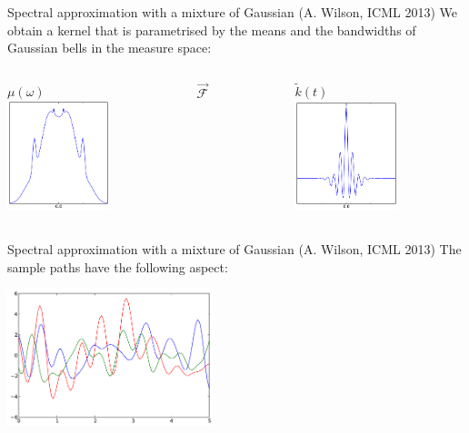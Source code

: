 \begin{frame}{Spectral approximation with a mixture of Gaussian (A. Wilson, ICML 2013)}
We obtain a kernel that is parametrised by the means and the bandwidths of Gaussian bells in the measure space:
\begin{columns}[c]
\begin{column}{5cm}
\begin{center}
$\mu(\omega)$ \\
\includegraphics[width=3cm]{3_gaussian_process_regression/figures/python/Bochner-wilsonmus}
\end{center}
\end{column}
\begin{column}{2cm}
\begin{center}
$\stackrel{\longrightarrow}{\mathcal{F}}$
\end{center}
\end{column}
\begin{column}{5cm}
\begin{center}
$\tilde{k}(t)$\\
\includegraphics[width=3cm]{3_gaussian_process_regression/figures/python/Bochner-wilsonks}
\end{center}
\end{column}
\end{columns}

\end{frame}

\begin{frame}{Spectral approximation with a mixture of Gaussian (A. Wilson, ICML 2013)}
The sample paths have the following aspect:\\
\vspace{5mm}
\begin{center}
\includegraphics[height=4cm]{3_gaussian_process_regression/figures/python/Bochner-wilsonktraj}
\end{center}
\end{frame}


